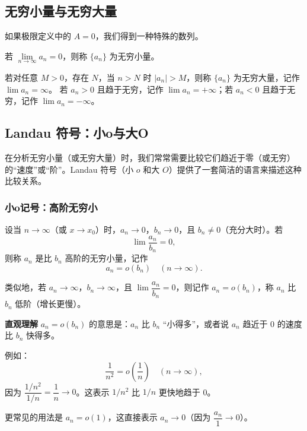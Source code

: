 \documentclass{ctexart}
\newenvironment{custom}[1]{\par\noindent \textbf{#1}\quad}{\par\vspace{1em}}
\begin{document}
\subsection{无穷小量与无穷大量}

如果极限定义中的 \(A = 0\)，我们得到一种特殊的数列。

\begin{definition}[无穷小量]
若 \(\lim\limits_{n\to\infty} a_n = 0\)，则称 \(\{a_n\}\) 为无穷小量。
\end{definition}

\begin{definition}[无穷大量]
若对任意 \(M > 0\)，存在 \(N\)，当 \(n > N\) 时 \(|a_n| > M\)，则称 \(\{a_n\}\) 为无穷大量，记作 \(\lim a_n = \infty\)。
若 \(a_n > 0\) 且趋于无穷，记作 \(\lim a_n = +\infty\)；若 \(a_n < 0\) 且趋于无穷，记作 \(\lim a_n = -\infty\)。
\end{definition}

\subsection{Landau 符号：小o与大O}

在分析无穷小量（或无穷大量）时，我们常常需要比较它们趋近于零（或无穷）的“速度”或“阶”。Landau 符号（小 \(o\) 和大 \(O\)）提供了一套简洁的语言来描述这种比较关系。

\subsubsection{小o记号：高阶无穷小}

\begin{definition}[小o记号]
设当 \(n \to \infty\)（或 \(x \to x_0\)）时，\(a_n \to 0\)，\(b_n \to 0\)，且 \(b_n \neq 0\)（充分大时）。若
\[
\lim \dfrac{a_n}{b_n} = 0,
\]
则称 \(a_n\) 是比 \(b_n\) 高阶的无穷小量，记作
\[
a_n = o(b_n) \quad (n \to \infty).
\]

类似地，若 \(a_n \to \infty\)，\(b_n \to \infty\)，且 \(\lim \dfrac{a_n}{b_n} = 0\)，则记作 \(a_n = o(b_n)\)，称 \(a_n\) 比 \(b_n\) 低阶（增长更慢）。
\end{definition}

\begin{custom}{直观理解}
\(a_n = o(b_n)\) 的意思是：\(a_n\) 比 \(b_n\) “小得多”，或者说 \(a_n\) 趋近于 0 的速度比 \(b_n\) 快得多。

例如：
\[
\dfrac{1}{n^2} = o\left(\dfrac{1}{n}\right) \quad (n \to \infty),
\]
因为 \(\dfrac{1/n^2}{1/n} = \dfrac{1}{n} \to 0\)。这表示 \(1/n^2\) 比 \(1/n\) 更快地趋于 0。

更常见的用法是 \(a_n = o(1)\)，这直接表示 \(a_n \to 0\)（因为 \(\dfrac{a_n}{1} \to 0\)）。
\end{custom}
\end{document}
